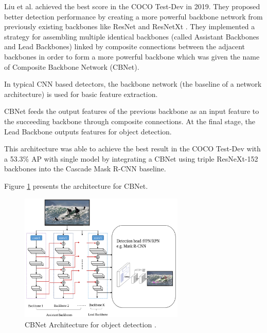 \par Liu et al. \cite{Liu2019} achieved the best score in the COCO Test-Dev in 2019. They proposed better detection performance by creating a more powerful backbone network from previously existing backbones like ResNet \cite{He2016} and ResNetXt \cite{Xie2017}. They implemented a strategy for assembling multiple identical backbones (called Assistant Backbones and Lead Backbones) linked by composite connections between the adjacent backbones in order to form a more powerful backbone which was given the name of Composite Backbone Network (CBNet).

\par In typical CNN based detectors, the backbone network (the baseline of a network architecture) is used for basic feature extraction.

\par CBNet feeds the output features of the previous backbone as an input feature to the succeeding backbone through composite connections. At the final stage, the Lead Backbone outputs features for object detection.

\par This architecture was able to achieve the best result in the COCO Test-Dev with a 53.3\% AP with single model by integrating a CBNet using triple ResNeXt-152 \cite{Xie2017} backbones into the Cascade Mask R-CNN baseline.


\par Figure \ref{fig:cbnet} presents the architecture for CBNet.



\begin{figure}[H]
    \centering
    \captionsetup{justification=centering}
    \includegraphics[width=0.7\textwidth]{Sections/2StateOfTheArt/2_images/cbnet.png}
    \caption[CBNet Architecture]{CBNet Architecture for object detection \cite{Liu2019}.} 
    \label{fig:cbnet}
\end{figure}


